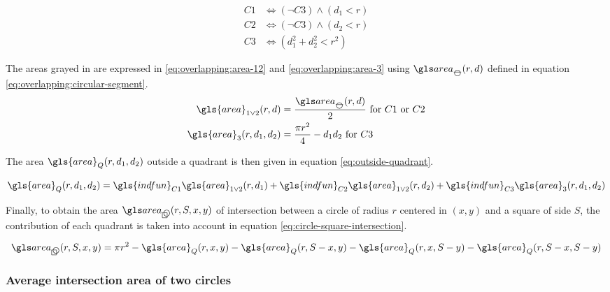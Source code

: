 \begin{appendix}
\begin{align}
  C1 &\Longleftrightarrow \left( \neg C3 \right) \wedge \left( d_1 < r \right) \label{eq:quadrant-case-1} \\
  C2 &\Longleftrightarrow \left( \neg C3 \right) \wedge \left( d_2 < r \right) \label{eq:quadrant-case-2} \\
  C3 &\Longleftrightarrow \left( d_1^2 + d_2^2 < r^2 \right) \label{eq:quadrant-case-3}
\end{align}

\medskip

The areas grayed in  are expressed in \eqref{eq:overlapping:area-12} and \eqref{eq:overlapping:area-3} using \( \cirseg(r, d) \) defined in equation \eqref{eq:overlapping:circular-segment}.
\begin{align}
\gls{area}_{1 \lor 2} (r, d) &= \frac{\cirseg(r, d)}{2} \label{eq:overlapping:area-12} \ \text{for } C1 \text{ or } C2 \\
\gls{area}_3 (r, d_1, d_2) &= \frac{\pi r^2}{4} - d_1 d_2 \label{eq:overlapping:area-3} \ \text{for } C3
\end{align}

\medskip

The area \( \gls{area}_Q (r, d_1, d_2) \) outside a quadrant is then given in equation \eqref{eq:outside-quadrant}.

\begin{equation}\label{eq:outside-quadrant}
  \gls{area}_Q (r, d_1, d_2) =
    \gls{indfun}_{C1} \gls{area}_{1 \lor 2} (r, d_1) +
    \gls{indfun}_{C2} \gls{area}_{1 \lor 2} (r, d_2) +
    \gls{indfun}_{C3} \gls{area}_{3} (r, d_1, d_2)
\end{equation}

\medskip

Finally, to obtain the area \( \cirsqr (r, S, x, y) \) of intersection between a circle of radius \( r \) centered in \( (x, y) \) and a square of side \( S \), the contribution of each quadrant is taken into account in equation \eqref{eq:circle-square-intersection}.

\begin{equation}\label{eq:circle-square-intersection}
  \cirsqr (r, S, x, y) =
    \pi r^2
    - \gls{area}_Q (r,     x,     y)
    - \gls{area}_Q (r, S - x,     y)
    - \gls{area}_Q (r,     x, S - y)
    - \gls{area}_Q (r, S - x, S - y)
\end{equation}

\subsubsection{Average intersection area of two circles}


\end{appendix}
